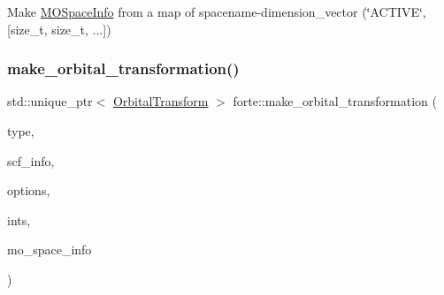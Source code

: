 Make \mbox{\hyperlink{classforte_1_1_m_o_space_info}{M\+O\+Space\+Info}} from a map of spacename-\/dimension\+\_\+vector (\char`\"{}\+A\+C\+T\+I\+V\+E\char`\"{}, \mbox{[}size\+\_\+t, size\+\_\+t, ...\mbox{]}) 

\mbox{\label{namespaceforte_ada49194260509ae60783b9a926de0867}} 
\subsubsection{\texorpdfstring{make\+\_\+orbital\+\_\+transformation()}{make\_orbital\_transformation()}}
{\footnotesize\ttfamily std\+::unique\+\_\+ptr$<$ \mbox{\hyperlink{classforte_1_1_orbital_transform}{Orbital\+Transform}} $>$ forte\+::make\+\_\+orbital\+\_\+transformation (\begin{DoxyParamCaption}\item[{const std\+::string \&}]{type,  }\item[{std\+::shared\+\_\+ptr$<$ \mbox{\hyperlink{classforte_1_1_s_c_f_info}{S\+C\+F\+Info}} $>$}]{scf\+\_\+info,  }\item[{std\+::shared\+\_\+ptr$<$ \mbox{\hyperlink{classforte_1_1_forte_options}{Forte\+Options}} $>$}]{options,  }\item[{std\+::shared\+\_\+ptr$<$ \mbox{\hyperlink{classforte_1_1_forte_integrals}{Forte\+Integrals}} $>$}]{ints,  }\item[{std\+::shared\+\_\+ptr$<$ \mbox{\hyperlink{classforte_1_1_m_o_space_info}{M\+O\+Space\+Info}} $>$}]{mo\+\_\+space\+\_\+info }\end{DoxyParamCaption})}

\mbox{\label{namespaceforte_a05397ae883351498d2604dec70e235e8}} 

